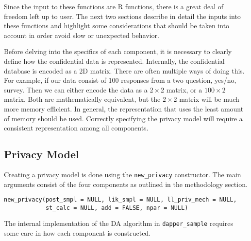 Since the input to these functions are R functions, there is a great deal of freedom
left up to user. The next two sections describe in detail the inputs into
these functions and highlight some considerations that should be taken
into account in order avoid slow or unexpected behavior.

Before delving into the specifics of each component, it is necessary to clearly
define how the confidential data is represented. Internally, the
confidential database is encoded as a 2D matrix. There are often multiple ways
of doing this. For example, if our data consist
of 100 responses from a two question, yes/no, survey. Then we can either encode
the data as a \(2 \times 2\) matrix, or a \(100 \times 2\) matrix. Both are mathematically
equivalent, but the \(2 \times 2\) matrix will be much more memory efficient.
In general, the representation that uses the least amount of memory should be
used. Correctly specifying the privacy model will require a consistent
representation among all components.

\hypertarget{privacy-model}{%
\subsection{Privacy Model}\label{privacy-model}}

Creating a privacy model is done using the \texttt{new\_privacy} constructor. The
main arguments consist of the four components as outlined in the methodology
section.

\begin{verbatim}
new_privacy(post_smpl = NULL, lik_smpl = NULL, ll_priv_mech = NULL,
            st_calc = NULL, add = FALSE, npar = NULL)
\end{verbatim}

The internal implementation of the DA algorithm in \texttt{dapper\_sample} requires
some care in how each component is constructed.

